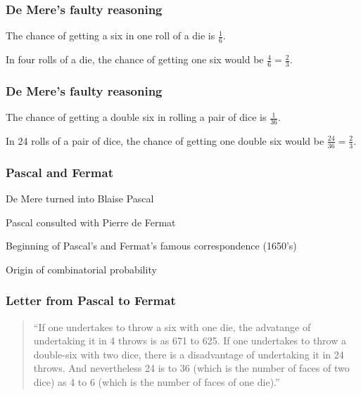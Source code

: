 \documentclass[12pt]{beamer}\usepackage[]{graphicx}\usepackage[]{color}
\begin{document}

\begin{frame}
\frametitle{De Mere's faulty reasoning}

\bbi
  \item The chance of getting a six in one roll of a die is $\frac{1}{6}$.
  \item In four rolls of a die, the chance of getting one six would be $\frac{4}{6}=\frac{2}{3}$.
\ei
\eb

\end{frame}


\begin{frame}
\frametitle{De Mere's faulty reasoning}

\bbi
  \item The chance of getting a double six in rolling a pair of dice is $\frac{1}{36}$.
  \item In 24 rolls of a pair of dice, the chance of getting one double six would be $\frac{24}{36}=\frac{2}{3}$.
\ei
\eb

\end{frame}


\begin{frame}
\frametitle{Pascal and Fermat}

\bbi
  \item De Mere turned into Blaise Pascal
  \item Pascal consulted with Pierre de Fermat
  \item Beginning of Pascal's and Fermat's famous correspondence (1650's)
  \item Origin of combinatorial probability
\ei

\end{frame}


\begin{frame}[fragile]
\frametitle{}
\begin{center}
\end{center}
\end{frame}


\begin{frame}
\frametitle{Letter from Pascal to Fermat}

\begin{quotation}
``If one undertakes to throw a six with one die, the advatange of undertaking it in 4 throws is as 671 to 625. If one undertakes to throw a double-six with two dice, there is a disadvantage of undertaking it in 24 throws. And nevertheless 24 is to 36 (which is the number of faces of two dice) as 4 to 6 (which is the number of faces of one die).''
\end{quotation}

\end{frame}
\end{document}
